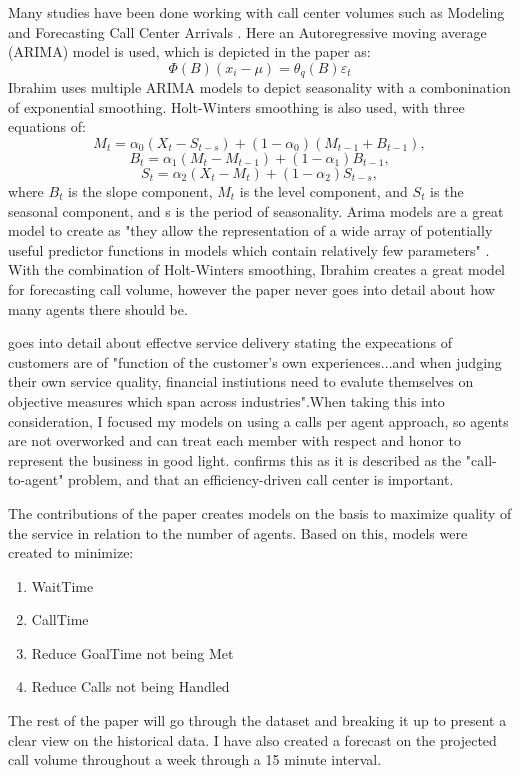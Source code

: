 \documentclass[12pt]{article}
\begin{document}
  Many studies have been done working with call center volumes such as Modeling and Forecasting Call Center Arrivals \citep{ibrahim2016modeling}.
Here an Autoregressive moving average (ARIMA) model is used, which is depicted in the paper as:
\begin{equation}
  \label{eq:ARIMA Standard}
  \Phi(B)(x_i -\mu)=\theta_q(B)\varepsilon_t
\end{equation}
Ibrahim uses multiple ARIMA models to depict seasonality with a combonination of exponential smoothing. Holt-Winters smoothing is also used,
with three equations of:
\begin{equation}
  \label{eq:Holt-Winters}
  M_t=\alpha_0(X_t-S_{t-s}) + (1-\alpha_0)(M_{t-1}+B_{t-1}),
\end{equation}
\begin{equation}
  \label{eq:Holt-Winters2}
  B_t=\alpha_1(M_t-M_{t-1}) +(1-\alpha_1)B_{t-1},
\end{equation}
\begin{equation}
  \label{eq:Holt-Winters3}
  S_t=\alpha_2(X_t-M_t) +(1-\alpha_2)S_{t-s},
\end{equation}
where $B_{t}$ is the slope component, $M_{t}$ is the level component, and $S_{t}$ is the seasonal component, and s is the period of seasonality.
Arima models are a great model to create as "they allow the  representation of a  wide array of potentially useful predictor functions in  models  which contain relatively few parameters" \citep{newbold1983arima}.
With the combination of Holt-Winters smoothing, Ibrahim creates a great model for forecasting call volume, however the paper never goes into detail about
how many agents there should be. 

  \citep{evensen1999effective} goes into detail about effectve service delivery stating the expecations of customers are of "function of
the customer's own experiences...and when judging their own service quality, financial instiutions need to evalute themselves on 
objective measures which span across industries".When taking this into consideration, I focused my models on using a calls per agent approach,
so agents are not overworked and can treat each member with respect and honor to represent the business in good light. \citep{avramidis2005modeling} confirms
this as it is described as the "call-to-agent" problem, and that an efficiency-driven call center is important.


  The contributions of the paper creates models on the basis to maximize quality of the service in relation to the number of agents. 
Based on this, models were created to minimize:
\begin{enumerate}
  \item WaitTime
  \item CallTime
  \item Reduce GoalTime not being Met
  \item Reduce Calls not being Handled
\end{enumerate}
The rest of the paper will go through the dataset and breaking it up to present a clear view on the historical data. I have also created a 
forecast on the projected call volume throughout a week through a 15 minute interval.
\end{document}

